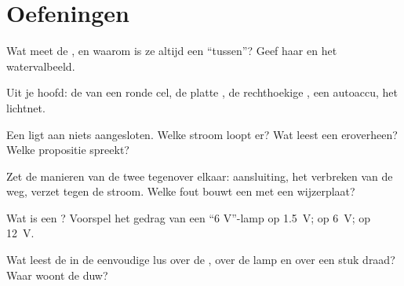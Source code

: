 \section{Oefeningen}

\begin{exercise}[$\star$]\label{exo:g8:voltage-voltmeter:1}
Wat meet de , en waarom is ze altijd een
``tussen''? Geef haar  en het
watervalbeeld.
\end{exercise}

\begin{exercise}[$\star$]\label{exo:g8:voltage-voltmeter:2}
Uit je hoofd: de  van een ronde cel, de platte
, de rechthoekige , een
autoaccu, het lichtnet.
\end{exercise}

\begin{exercise}[$\star$]\label{exo:g8:voltage-voltmeter:3}
Een  ligt aan niets aangesloten. Welke stroom loopt er?
Wat leest een  eroverheen? Welke propositie spreekt?
\end{exercise}

\begin{exercise}[$\star$]\label{exo:g8:voltage-voltmeter:4}
Zet de manieren van de twee  tegenover elkaar: aansluiting, het
verbreken van de weg, verzet tegen de stroom. Welke fout bouwt een
 met een wijzerplaat?
\end{exercise}

\begin{exercise}[$\star$]\label{exo:g8:voltage-voltmeter:5}
Wat is een ? Voorspel het gedrag van een
``6 V''-lamp op \qty{1.5}{V}; op \qty{6}{V}; op \qty{12}{V}.
\end{exercise}

\begin{exercise}[$\star$]\label{exo:g8:voltage-voltmeter:6}
Wat leest de  in de eenvoudige lus over de
, over de lamp en over een stuk draad? Waar woont de
duw?
\end{exercise}

